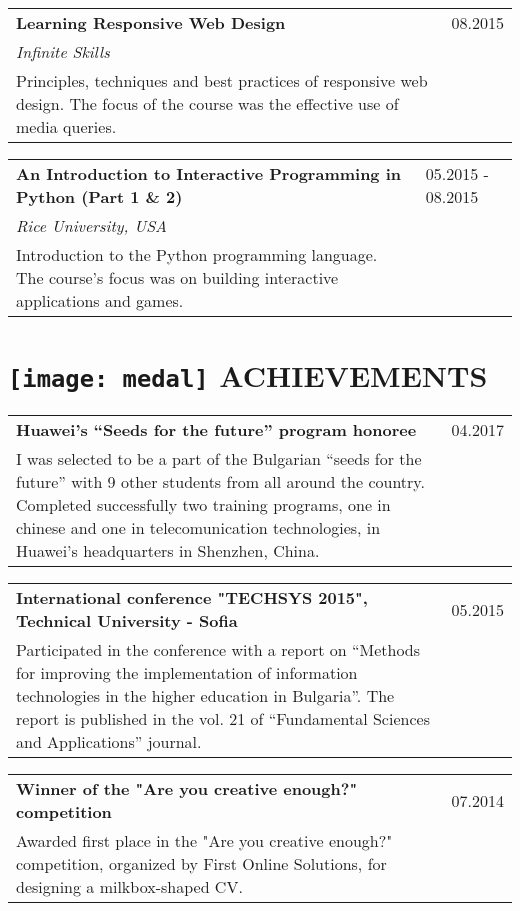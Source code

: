 \documentclass[a4paper,10pt]{article}
\begin{document}
\begin{tabular}{|p{11cm}l}
\textbf{Learning Responsive Web Design} & 08.2015 \\
    \emph{Infinite Skills} & \\
    \footnotesize{Principles, techniques and best practices of responsive web design. The focus of the course was the effective use of media queries.} \\
\end{tabular}

\begin{tabular}{|p{11cm}l}
\textbf{An Introduction to Interactive Programming in Python (Part 1 \& 2)} & 05.2015 - 08.2015 \\
    \emph{Rice University, USA} & \\
    \footnotesize{Introduction to the Python programming language. The course’s focus was on building interactive applications and games.} \\
\end{tabular}

\section{\protect\texttt{[image: medal]} ACHIEVEMENTS}

\begin{tabular}{|p{11cm}l}
\textbf{Huawei’s “Seeds for the future” program honoree} & 04.2017 \\
    \footnotesize{I was selected to be a part of the Bulgarian “seeds for the future” with 9 other students from all around the country. Completed successfully two training programs, one in chinese and one in telecomunication technologies, in Huawei’s headquarters in Shenzhen, China.} \\
\end{tabular}

\begin{tabular}{|p{11cm}l}
\textbf{International conference "TECHSYS 2015", Technical University - Sofia} & 05.2015 \\
    \footnotesize{Participated in the conference with a report on “Methods for improving the
implementation of information technologies in the higher education in Bulgaria”. The
report is published in the vol. 21 of “Fundamental Sciences and Applications” journal.} \\
\end{tabular}

\begin{tabular}{|p{11cm}l}
\textbf{Winner of the "Are you creative enough?" competition} & 07.2014 \\
    \footnotesize{Awarded first place in the "Are you creative enough?" competition, organized by First Online Solutions, for designing a milkbox-shaped CV.} \\
\end{tabular}
\end{document}
